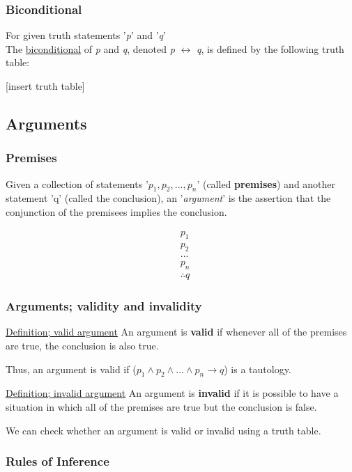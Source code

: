 \documentclass{article}
\begin{document}
\subsubsection{Biconditional}
For given truth statements '\textit{p}' and '\textit{q}' \\
The \underline{biconditional} of  \textit{p} and \textit{q}, denoted \textit{p} $\leftrightarrow$ \textit{q},
 is defined by the following truth table:

[insert truth table]

\subsection{Arguments}

\subsubsection{Premises}

Given a collection of statements '$p_1 , p_2, ... , p_n$' (called \textbf{premises}) and another statement 'q' (called the conclusion),
an '\textit{argument}' is the assertion that the conjunction of the premisees implies the conclusion.

\begin{align*}
& p_1 \\ 
& p_2 \\
& ... \\
& p_n \\
& \therefore q
\end{align*}

\subsubsection{Arguments; validity and invalidity}

\underline{Definition; valid argument}
An argument is \textbf{valid} if whenever all of the premises are true, the conclusion is also true. 

Thus, an argument is valid if ($p_1 \wedge p_2 \wedge ... \wedge p_n \rightarrow q$) is a tautology.

\underline{Definition; invalid argument}
An argument is \textbf{invalid} if it is possible to have a situation in which all of the premises are true but the conclusion is false.

We can check whether an argument is valid or invalid using a truth table.

\subsubsection{Rules of Inference}
\end{document}
